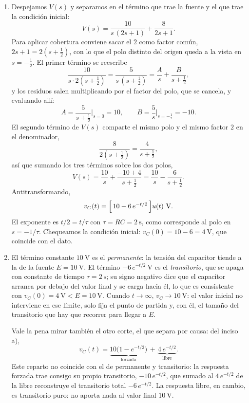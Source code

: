\documentclass[10pt,a4paper]{article}
\begin{document}
\begin{enumerate}
	\item Despejamos $V(s)$ y separamos en el término que trae la fuente y
	el que trae la condición inicial:
	\[
		V(s)=\frac{10}{s\,(2s+1)}+\frac{8}{2s+1}.
	\]
	Para aplicar cobertura conviene sacar el $2$ como factor común,
	$2s+1=2(s+\tfrac12)$, con lo que el polo distinto del origen queda a la
	vista en $s=-\tfrac12$. El primer término se reescribe
	\[
		\frac{10}{s\cdot 2(s+\frac12)}=\frac{5}{s\,(s+\frac12)}
		=\frac{A}{s}+\frac{B}{s+\frac12},
	\]
	y los residuos salen multiplicando por el factor del polo, que se
	cancela, y evaluando allí:
	\[
		A=\frac{5}{s+\frac12}\bigg|_{s=0}=10,
		\qquad
		B=\frac{5}{s}\bigg|_{s=-\frac12}=-10.
	\]
	El segundo término de $V(s)$ comparte el mismo polo y el mismo factor
	$2$ en el denominador,
	\[
		\frac{8}{2(s+\frac12)}=\frac{4}{s+\frac12},
	\]
	así que sumando los tres términos sobre los dos polos,
	\[
		V(s)=\frac{10}{s}+\frac{-10+4}{s+\frac12}
		    =\frac{10}{s}-\frac{6}{s+\frac12}.
	\]
	Antitransformando,
	\[
		v_C(t)=\Bigl[\,10-6\,e^{-t/2}\,\Bigr]u(t)\ \text{V}.
	\]
	El exponente es $t/2=t/\tau$ con $\tau=RC=2\ \text{s}$, como corresponde
	al polo en $s=-1/\tau$. Chequeamos la condición inicial:
	$v_C(0)=10-6=4\ \text{V}$, que coincide con el dato.

	\item El término constante $10\ \text{V}$ es el \emph{permanente}: la
	tensión del capacitor tiende a la de la fuente $E=10\ \text{V}$. El
	término $-6\,e^{-t/2}\ \text{V}$ es el \emph{transitorio}, que se apaga
	con constante de tiempo $\tau=2\ \text{s}$; su signo negativo dice que el
	capacitor arranca por debajo del valor final y se carga hacia él, lo que
	es consistente con $v_C(0)=4\ \text{V}<E=10\ \text{V}$. Cuando
	$t\to\infty$, $v_C\to 10\ \text{V}$: el valor inicial no interviene en
	ese límite, solo fija el punto de partida y, con él, el tamaño del
	transitorio que hay que recorrer para llegar a $E$.

	Vale la pena mirar también el otro corte, el que separa por causa: del
	inciso a),
	\[
		v_C(t)=\underbrace{10\bigl(1-e^{-t/2}\bigr)}_{\text{forzada}}
		      \,+\,\underbrace{4\,e^{-t/2}}_{\text{libre}}.
	\]
	Este reparto no coincide con el de permanente y transitorio: la
	respuesta forzada trae consigo su propio transitorio, $-10\,e^{-t/2}$,
	que sumado al $4\,e^{-t/2}$ de la libre reconstruye el transitorio
	total $-6\,e^{-t/2}$. La respuesta libre, en cambio, es transitorio
	puro: no aporta nada al valor final $10\ \text{V}$.
\end{enumerate}
\end{document}
